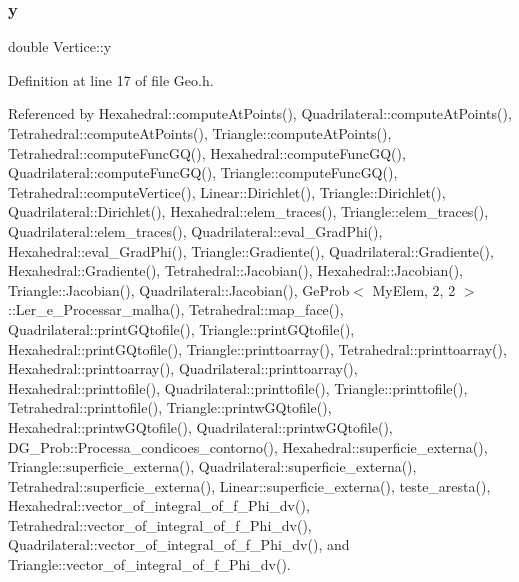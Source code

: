 \mbox{\label{structVertice_a4472a6e34444c9799b72709f710ba3d8}} 
\subsubsection{\texorpdfstring{y}{y}}
{\footnotesize\ttfamily double Vertice\+::y}



Definition at line 17 of file Geo.\+h.



Referenced by Hexahedral\+::compute\+At\+Points(), Quadrilateral\+::compute\+At\+Points(), Tetrahedral\+::compute\+At\+Points(), Triangle\+::compute\+At\+Points(), Tetrahedral\+::compute\+Func\+G\+Q(), Hexahedral\+::compute\+Func\+G\+Q(), Quadrilateral\+::compute\+Func\+G\+Q(), Triangle\+::compute\+Func\+G\+Q(), Tetrahedral\+::compute\+Vertice(), Linear\+::\+Dirichlet(), Triangle\+::\+Dirichlet(), Quadrilateral\+::\+Dirichlet(), Hexahedral\+::elem\+\_\+traces(), Triangle\+::elem\+\_\+traces(), Quadrilateral\+::elem\+\_\+traces(), Quadrilateral\+::eval\+\_\+\+Grad\+Phi(), Hexahedral\+::eval\+\_\+\+Grad\+Phi(), Triangle\+::\+Gradiente(), Quadrilateral\+::\+Gradiente(), Hexahedral\+::\+Gradiente(), Tetrahedral\+::\+Jacobian(), Hexahedral\+::\+Jacobian(), Triangle\+::\+Jacobian(), Quadrilateral\+::\+Jacobian(), Ge\+Prob$<$ My\+Elem, 2, 2 $>$\+::\+Ler\+\_\+e\+\_\+\+Processar\+\_\+malha(), Tetrahedral\+::map\+\_\+face(), Quadrilateral\+::print\+G\+Qtofile(), Triangle\+::print\+G\+Qtofile(), Hexahedral\+::print\+G\+Qtofile(), Triangle\+::printtoarray(), Tetrahedral\+::printtoarray(), Hexahedral\+::printtoarray(), Quadrilateral\+::printtoarray(), Hexahedral\+::printtofile(), Quadrilateral\+::printtofile(), Triangle\+::printtofile(), Tetrahedral\+::printtofile(), Triangle\+::printw\+G\+Qtofile(), Hexahedral\+::printw\+G\+Qtofile(), Quadrilateral\+::printw\+G\+Qtofile(), D\+G\+\_\+\+Prob\+::\+Processa\+\_\+condicoes\+\_\+contorno(), Hexahedral\+::superficie\+\_\+externa(), Triangle\+::superficie\+\_\+externa(), Quadrilateral\+::superficie\+\_\+externa(), Tetrahedral\+::superficie\+\_\+externa(), Linear\+::superficie\+\_\+externa(), teste\+\_\+aresta(), Hexahedral\+::vector\+\_\+of\+\_\+integral\+\_\+of\+\_\+f\+\_\+\+Phi\+\_\+dv(), Tetrahedral\+::vector\+\_\+of\+\_\+integral\+\_\+of\+\_\+f\+\_\+\+Phi\+\_\+dv(), Quadrilateral\+::vector\+\_\+of\+\_\+integral\+\_\+of\+\_\+f\+\_\+\+Phi\+\_\+dv(), and Triangle\+::vector\+\_\+of\+\_\+integral\+\_\+of\+\_\+f\+\_\+\+Phi\+\_\+dv().

